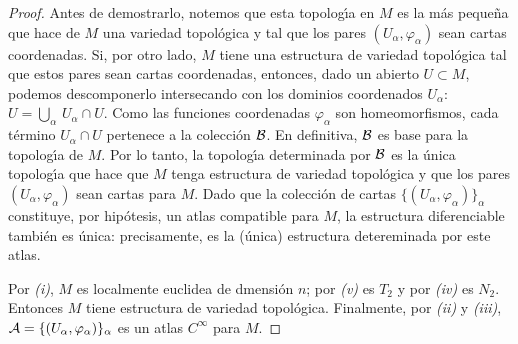 \begin{proof}
	Antes de demostrarlo, notemos que esta topolog\'{\i}a en $M$ es la
	m\'{a}s peque\~{n}a que hace de $M$ una variedad topol\'{o}gica y
	tal que los pares $(U_{\alpha},\varphi_{\alpha})$ sean cartas
	coordenadas. Si, por otro lado, $M$ tiene una estructura de
	variedad topol\'{o}gica tal que estos pares sean cartas coordenadas,
	entonces, dado un abierto $U\subset M$, podemos descomponerlo
	intersecando con los dominios coordenados $U_{\alpha}$:
	$U=\bigcup_{\alpha}\,U_{\alpha}\cap U$. Como las funciones
	coordenadas $\varphi_{\alpha}$ son homeomorfismos, cada t\'{e}rmino
	$U_{\alpha}\cap U$ pertenece a la colecci\'{o}n $\cal{B}$. En
	definitiva, $\cal{B}$ es base para la topolog\'{\i}a de $M$.
	Por lo tanto, la topolog\'{\i}a determinada por $\cal{B}$ es la
	\'{u}nica topolog\'{\i}a que hace que $M$ tenga estructura de
	variedad topol\'{o}gica y que los pares
	$(U_{\alpha},\varphi_{\alpha})$ sean cartas para $M$. Dado que la
	colecci\'{o}n de cartas $\{(U_{\alpha},\varphi_{\alpha})\}_{\alpha}$
	constituye, por hip\'{o}tesis, un atlas compatible para $M$,
	la estructura diferenciable tambi\'{e}n es \'{u}nica: precisamente,
	es la (\'{u}nica) estructura detereminada por este atlas.

	Por \textit{(i)}, $M$ es localmente euclidea de dmensi\'{o}n $n$;
	por \textit{(v)} es $T_{2}$ y por \textit{(iv)} es $N_{2}$.
	Entonces $M$ tiene estructura de variedad topol\'{o}gica. Finalmente,
	por \textit{(ii)} y \textit{(iii)}, $\cal{A}=%
	\{(U_{\alpha},\varphi_{\alpha})\}_{\alpha}$ es un atlas $C^{\infty}$
	para $M$.
\end{proof}


